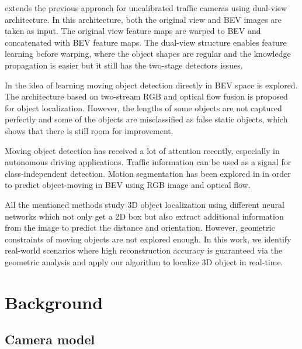 \documentclass[graybox]{svmult}
\begin{document}
\cite{bev_2} extends the previous approach for uncalibrated traffic cameras using dual-view architecture.
In this architecture, both the original view and BEV images are taken as input. The original view feature maps are warped
to BEV and concatenated with BEV feature maps. The dual-view structure enables feature learning before warping, where the object shapes are regular and the
knowledge propagation is easier but it still has the two-stage detectors issues.


In \cite{bev_mod} the idea of learning moving object detection directly in BEV space is explored. 
The architecture based on two-stream RGB and optical flow fusion is proposed for object localization.
However, the lengths of some objects are not captured perfectly and some of the objects are misclassified as false static objects, which shows that there is still room for
improvement.

Moving object detection has received a lot of attention recently, especially in autonomous driving applications. Traffic information can be used as a signal for class-independent detection.
Motion segmentation has been explored in \cite{bev_mod} in order to predict object-moving in BEV using RGB image and optical flow.

All the mentioned methods study 3D object localization using different neural networks which not only get a 2D box but also extract additional information from the image to predict the distance and orientation.
However, geometric constraints of moving objects are not explored enough. 
In this work, we identify real-world scenarios where high reconstruction accuracy is guaranteed via the geometric analysis and apply our algorithm to localize 3D object in real-time.




\section{Background} \label{sec:back}
\subsection{Camera model}
\end{document}
